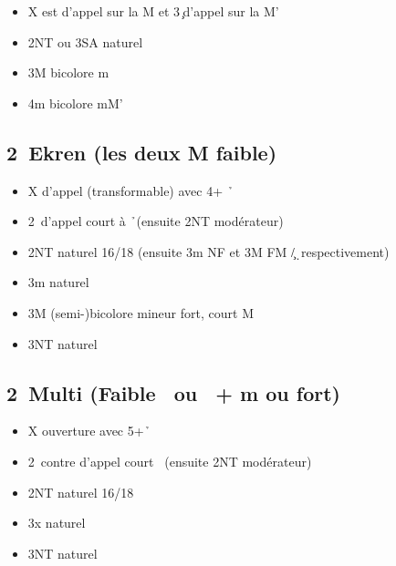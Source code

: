 \documentclass[a4paper]{article}
\begin{document}
\begin{itemize}
\item X est d'appel sur la M et 3\c\ d'appel sur la M'

\item 2NT ou 3SA naturel

\item 3M bicolore m 

\item 4m bicolore mM'

\end{itemize}

\subsection{2\pdfh\ Ekren (les deux M faible)}

\begin{itemize}
\item X d'appel (transformable) avec 4+ \h\ 

\item 2\s\ d'appel court à \h\ (ensuite 2NT modérateur)

\item 2NT naturel 16/18 (ensuite 3m NF et 3M FM \c /\d\ respectivement)

\item 3m naturel

\item 3M (semi-)bicolore mineur fort, court M

\item 3NT naturel

\end{itemize}

\subsection{2\pdfh\ Multi (Faible \pdfs\ ou \pdfs\ + m ou fort)}

\begin{itemize}
\item X ouverture avec 5+\h\ 

\item 2\s\ contre d'appel court \s\ (ensuite 2NT modérateur)

\item 2NT naturel 16/18

\item 3x naturel

\item 3NT naturel

\end{itemize}
\end{document}
